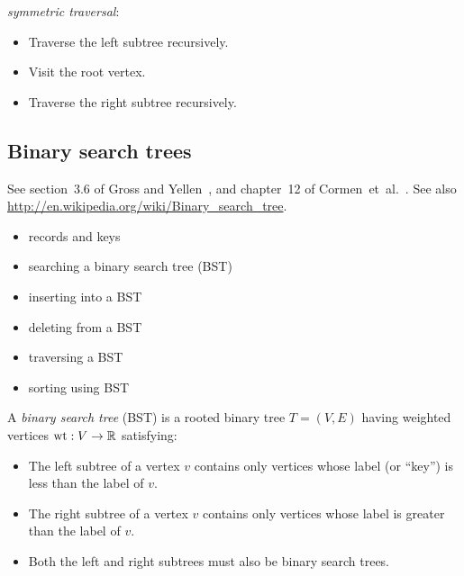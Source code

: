 \noindent
{\it symmetric traversal}:
\begin{itemize}
\item
Traverse the left subtree recursively.

\item
Visit the root vertex.

\item
Traverse the right subtree recursively.

\end{itemize}


\subsection{Binary search trees}

See section~3.6 of Gross and Yellen~\cite{GrossYellen1999}, and
chapter~12 of Cormen~et~al.~\cite{CormenEtAl2001}. See also
\url{http://en.wikipedia.org/wiki/Binary_search_tree}.


\begin{itemize}
\item records and keys

\item searching a binary search tree (BST)

\item inserting into a BST

\item deleting from a BST

\item traversing a BST

\item sorting using BST
\end{itemize}

A {\it binary search tree} (BST) is a rooted binary tree
$T=(V,E)$ having weighted vertices ${\rm wt}:V\to {\mathbb{R}}$ satisfying:

\begin{itemize}
\item
 The left subtree of a vertex $v$ contains only vertices whose label
(or ``key'') is less than the label of $v$.
\item
The right subtree of a vertex $v$ contains only vertices whose label
  is greater than the label of $v$.
\item
Both the left and right subtrees must also be binary search trees.
\end{itemize}

